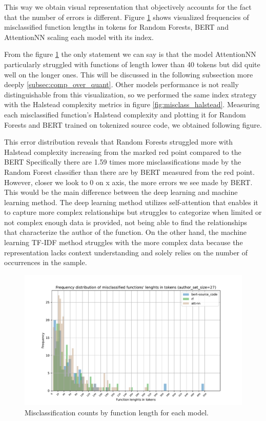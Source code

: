 \documentclass[conference]{IEEEtran}
\begin{document}
This way we obtain visual representation that objectively accounts for the fact that the number of errors is different.
Figure \ref{fig:misclass_lens} shows visualized frequencies of misclassified function lengths in tokens for Random Forests, BERT and AttentionNN scaling each 
model with its index.

From the figure \ref{fig:misclass_lens} the only statement we can say is that the model AttentionNN particularly struggled with functions of length lower than 40 tokens
but did quite well on the longer ones. This will be discussed in the following subsection more deeply \ref{subsec:comp_over_quant}.
Other models performance is not really distinguishable from this visualization, so we performed the same index strategy with the Halstead complexity metrics in figure \ref{fig:misclass_halstead}.
Measuring each misclassified function's Halstead complexity and plotting it for Random Forests and BERT trained on tokenized source code, we obtained following figure.

This error distribution reveals that Random Forests struggled more with Halstead complexity increasing from the marked red point compared to the BERT 
Specifically there are 1.59 times more misclassifications made by the Random Forest classifier than there are by BERT measured from the red point.
However, closer we look to 0 on x axis, the more errors we see made by BERT. This would be the main difference between the deep learning and 
machine learning method. The deep learning method utilizes self-attention that enables it to capture more complex relationships but struggles
to categorize when limited or not complex enough data is provided, not being able to find the relationships that characterize the author of the function. 
On the other hand, the machine learning TF-IDF method struggles with the more complex data because the representation lacks context understanding and solely 
relies on the number of occurrences in the sample.

\begin{figure}[H]
    \centering
    \hspace*{-25pt}\includegraphics[width=1.2\columnwidth]{figures/misclass_lens.pdf}
\caption{Misclassification counts by function length for each model.}
    \label{fig:misclass_lens}
\end{figure}
\end{document}
